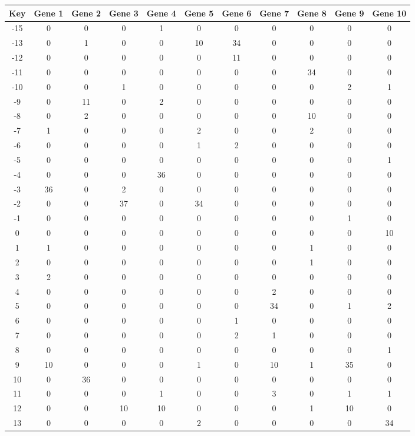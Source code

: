 \begin{tabular}{|c|c|c|c|c|c|c|c|c|c|c|}
\hline
Key & Gene 1 & Gene 2 & Gene 3 & Gene 4 & Gene 5 & Gene 6 & Gene 7 & Gene 8 & Gene 9 & Gene 10 \\
\hline
-15 & 0 & 0 & 0 & 1 & 0 & 0 & 0 & 0 & 0 & 0 \\
-13 & 0 & 1 & 0 & 0 & 10 & 34 & 0 & 0 & 0 & 0 \\
-12 & 0 & 0 & 0 & 0 & 0 & 11 & 0 & 0 & 0 & 0 \\
-11 & 0 & 0 & 0 & 0 & 0 & 0 & 0 & 34 & 0 & 0 \\
-10 & 0 & 0 & 1 & 0 & 0 & 0 & 0 & 0 & 2 & 1 \\
-9 & 0 & 11 & 0 & 2 & 0 & 0 & 0 & 0 & 0 & 0 \\
-8 & 0 & 2 & 0 & 0 & 0 & 0 & 0 & 10 & 0 & 0 \\
-7 & 1 & 0 & 0 & 0 & 2 & 0 & 0 & 2 & 0 & 0 \\
-6 & 0 & 0 & 0 & 0 & 1 & 2 & 0 & 0 & 0 & 0 \\
-5 & 0 & 0 & 0 & 0 & 0 & 0 & 0 & 0 & 0 & 1 \\
-4 & 0 & 0 & 0 & 36 & 0 & 0 & 0 & 0 & 0 & 0 \\
-3 & 36 & 0 & 2 & 0 & 0 & 0 & 0 & 0 & 0 & 0 \\
-2 & 0 & 0 & 37 & 0 & 34 & 0 & 0 & 0 & 0 & 0 \\
-1 & 0 & 0 & 0 & 0 & 0 & 0 & 0 & 0 & 1 & 0 \\
0 & 0 & 0 & 0 & 0 & 0 & 0 & 0 & 0 & 0 & 10 \\
1 & 1 & 0 & 0 & 0 & 0 & 0 & 0 & 1 & 0 & 0 \\
2 & 0 & 0 & 0 & 0 & 0 & 0 & 0 & 1 & 0 & 0 \\
3 & 2 & 0 & 0 & 0 & 0 & 0 & 0 & 0 & 0 & 0 \\
4 & 0 & 0 & 0 & 0 & 0 & 0 & 2 & 0 & 0 & 0 \\
5 & 0 & 0 & 0 & 0 & 0 & 0 & 34 & 0 & 1 & 2 \\
6 & 0 & 0 & 0 & 0 & 0 & 1 & 0 & 0 & 0 & 0 \\
7 & 0 & 0 & 0 & 0 & 0 & 2 & 1 & 0 & 0 & 0 \\
8 & 0 & 0 & 0 & 0 & 0 & 0 & 0 & 0 & 0 & 1 \\
9 & 10 & 0 & 0 & 0 & 1 & 0 & 10 & 1 & 35 & 0 \\
10 & 0 & 36 & 0 & 0 & 0 & 0 & 0 & 0 & 0 & 0 \\
11 & 0 & 0 & 0 & 1 & 0 & 0 & 3 & 0 & 1 & 1 \\
12 & 0 & 0 & 10 & 10 & 0 & 0 & 0 & 1 & 10 & 0 \\
13 & 0 & 0 & 0 & 0 & 2 & 0 & 0 & 0 & 0 & 34 \\
\hline
\end{tabular}